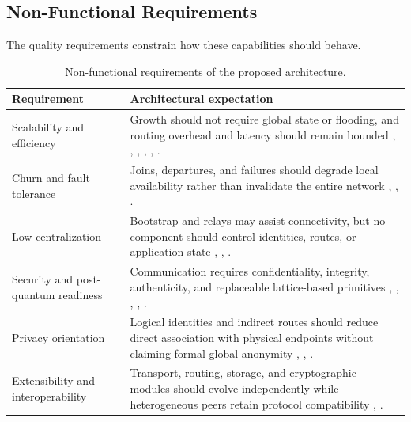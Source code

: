 \documentclass[
  12pt,
  oneside,
  a4paper,
  chapter=TITLE,
  section=TITLE,
  english,
  brazil
]{abntex2}
\begin{document}
\subsection{Non-Functional Requirements}

The quality requirements constrain how these capabilities should behave.

\begin{table}[H]
\centering
\caption{Non-functional requirements of the proposed architecture.}
\label{tab:non-functional-requirements}
\begin{tabularx}{\textwidth}{L{0.27\textwidth} Y}
\toprule
\textbf{Requirement} & \textbf{Architectural expectation} \\
\midrule
Scalability and efficiency & Growth should not require global state or flooding, and routing overhead and latency should remain bounded \cite{stoica2001chord}, \cite{maymounkov2002kademlia}, \cite{rowstron2001pastry}, \cite{tosic2022spatial}, \cite{mehr2019unstructured}, \cite{augustine2022byzantine}. \\
Churn and fault tolerance & Joins, departures, and failures should degrade local availability rather than invalidate the entire network \cite{tosic2022spatial}, \cite{augustine2022byzantine}, \cite{qian2016garlic}. \\
Low centralization & Bootstrap and relays may assist connectivity, but no component should control identities, routes, or application state \cite{li2022unreachable}, \cite{mirzaei2018pk}, \cite{qian2016garlic}. \\
Security and post-quantum readiness & Communication requires confidentiality, integrity, authenticity, and replaceable lattice-based primitives \cite{mirzaei2018pk}, \cite{shor1997quantum}, \cite{regev2009lwe}, \cite{bos2017kyber}, \cite{nist2024fips203}. \\
Privacy orientation & Logical identities and indirect routes should reduce direct association with physical endpoints without claiming formal global anonymity \cite{tosic2022spatial}, \cite{mirzaei2018pk}, \cite{qian2016garlic}. \\
Extensibility and interoperability & Transport, routing, storage, and cryptographic modules should evolve independently while heterogeneous peers retain protocol compatibility \cite{li2022unreachable}, \cite{augustine2022byzantine}. \\
\bottomrule
\end{tabularx}
\end{table}
\end{document}
